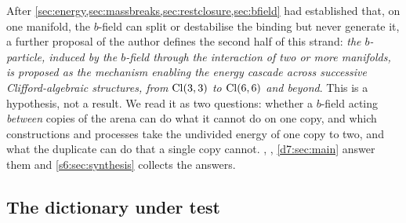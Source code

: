 After \cref{sec:energy,sec:massbreaks,sec:restclosure,sec:bfield} had established that, on one manifold, the $b$-field can split or destabilise the binding but never
generate it, a further proposal of the author defines the second half of this strand: \emph{the $b$-particle, induced by the $b$-field
through the interaction of two or more manifolds, is proposed as the mechanism enabling the energy cascade across successive
Clifford-algebraic structures, from $\mathrm{Cl}(3,3)$ to $\mathrm{Cl}(6,6)$ and beyond}. This is a hypothesis, not a result. We read it as two questions:
whether a $b$-field acting \emph{between} copies of the arena can do what it cannot do on one copy, and which constructions and processes
take the undivided energy of one copy to two, and what the duplicate can do that a single copy cannot. , , \cref{d7:sec:main} answer them and
\cref{s6:sec:synthesis} collects the answers.

\subsection{The dictionary under test}

